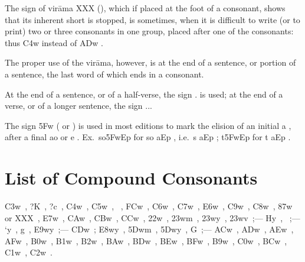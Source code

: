\s The sign of virāma XXX (), which if placed at the foot
of a consonant, shows that its inherent short  is stopped, is
sometimes, when it is difficult to write (or to print) two or three
consonants in one group, placed after one of the consonants: thus
{\dn {}\3C4w\?} instead of {\dn {}\3ADw\?} .

\s The proper use of the virāma, however, is at the end of a sentence,
or portion of a sentence, the last word of which ends in a consonant.

At the end of a sentence, or of a half-verse, the sign {\dn .} is used; at
the end of a verse, or of a longer sentence, the sign {\dn ..}.

\s The sign {\dn \35Fw} ( or ) is used in most
editions to mark the elision of an initial {\dn a} , after a final {\dn ao}
 or {\dn e} . Ex.\ {\dn so\35FwEp}  for {\dn so aEp} ,
i.e.\ {\dn s aEp} ; {\dn t\?\35FwEp}  for {\dn t\? aEp} .

\section{List of Compound Consonants}

{\dn \3C3w}~, {\dn ?K}~, {\dn ?c}~, {\dn \3C4w}~,
{\dn \3C5w}~, {\dn {}}~, {\dn \3FCw}~,
{\dn \3C6w}~, {\dn \3C7w}~, {\dn \3E6w}~,
{\dn \3C9w}~, {\dn \3C8w}~, %
{\dn \387w} or XXX~, %
{\dn \3E7w}~, %
{\dn \3CAw}~, {\dn \3CBw}~, {\dn \3CCw}~, {\dn \322w}~,
{\dn \323wm}~, {\dn \323wy}~, {\dn \323wv}~;—%
%
{\dn Hy}~, {\dn {}}~;—%
%
{\dn `y}~, {\dn g\5}~, {\dn \3E9wy}~;—%
%
{\dn \3CDw}~; {\dn \3E8wy}~, {\dn \35Dwm}~,
{\dn \35Dwy}~, {\dn G\5}~;—%
%
{\dn \3ACw}~, {\dn \3ADw}~, {\dn \3AEw}~,
{\dn \3AFw}~, {\dn \3B0w}~, {\dn \3B1w}~,
{\dn \3B2w}~, {\dn \3BAw}~, {\dn \3BDw}~,
{\dn \3BEw}~, {\dn \3BFw}~, {\dn \3B9w}~,
{\dn \3C0w}~, {\dn \3BCw}~, {\dn \3C1w}~,
{\dn \3C2w}~.

